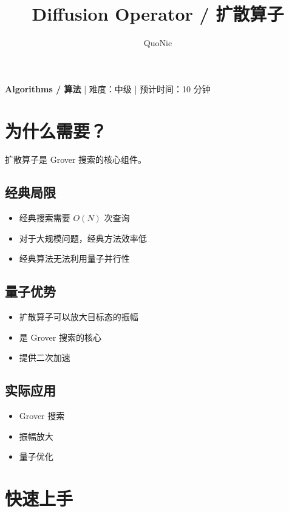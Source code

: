 \documentclass[12pt,a4paper]{article}
\title{Diffusion Operator / 扩散算子}
\author{QuoNic}
\date{}
\begin{document}
\maketitle

\begin{center}
\textbf{Algorithms / 算法} | 难度：中级 | 预计时间：10 分钟
\end{center}

\tableofcontents
\newpage

\section{为什么需要？}

扩散算子是 Grover 搜索的核心组件。

\subsection{经典局限}
\begin{itemize}
  \item 经典搜索需要 $O(N)$ 次查询
  \item 对于大规模问题，经典方法效率低
  \item 经典算法无法利用量子并行性
\end{itemize}

\subsection{量子优势}
\begin{itemize}
  \item 扩散算子可以放大目标态的振幅
  \item 是 Grover 搜索的核心
  \item 提供二次加速
\end{itemize}

\subsection{实际应用}
\begin{itemize}
  \item Grover 搜索
  \item 振幅放大
  \item 量子优化
\end{itemize}

\section{快速上手}
\end{document}
